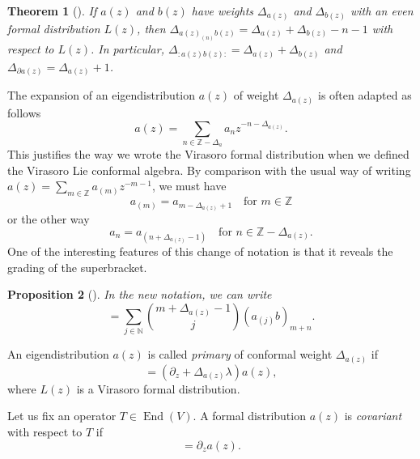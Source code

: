 \documentclass[a4paper, 12pt, reqno]{amsart}
\newtheorem{theorem}{Theorem}[section]
\newtheorem{proposition}[theorem]{Proposition}
\theoremstyle{remark}
\numberwithin{equation}{subsection}
\DeclareMathOperator{\End}{End}
\begin{document}
\begin{theorem}[{\cite[Proposition 3.7.4]{nozaradan_introduction_2008}}]
  \label{thr:13}
  If $a(z)$ and $b(z)$ have weights $\Delta_{a(z)}$ and $\Delta_{b(z)}$ with an even formal distribution $L(z)$, then $\Delta_{a(z)_{(n)}b(z)} = \Delta_{a(z)} + \Delta_{b(z)} - n - 1$ with respect to $L(z)$.
  In particular, $\Delta_{:a(z)b(z):} = \Delta_{a(z)} + \Delta_{b(z)}$ and $\Delta_{\partial a(z)} = \Delta_{a(z)} + 1$.
\end{theorem}

The expansion of an eigendistribution $a(z)$ of weight $\Delta_{a(z)}$ is often adapted as follows
\begin{equation*}
  a(z) = \sum_{n \in \mathbb{Z} - \Delta_a}a_nz^{-n - \Delta_{a(z)}}.
\end{equation*}
This justifies the way we wrote the Virasoro formal distribution when we defined the Virasoro Lie conformal algebra.
By comparison with the usual way of writing $a(z) = \sum_{m \in \mathbb{Z}}a_{(m)}z^{-m - 1}$, we must have
\begin{equation*}
  a_{(m)} = a_{m - \Delta_{a(z)} + 1} \quad \text{for }m \in \mathbb{Z}
\end{equation*}
or the other way
\begin{equation*}
  a_n = a_{(n + \Delta_{a(z)} - 1)} \quad \text{for }n \in \mathbb{Z} - \Delta_{a(z)}.
\end{equation*}
One of the interesting features of this change of notation is that it reveals the grading of the superbracket.

\begin{proposition}[{\cite[Proposition 3.7.6]{nozaradan_introduction_2008}}]
  \label{prp:8}
  In the new notation, we can write
  \begin{equation*}
    [a_m, b_n] = \sum_{j \in \mathbb{N}}\binom{m + \Delta_{a(z)} - 1}{j}(a_{(j)}b)_{m + n}.
  \end{equation*}
\end{proposition}

An eigendistribution $a(z)$ is called \emph{primary} of conformal weight $\Delta_{a(z)}$ if
\begin{equation*}
  [L(z)_{\lambda}a(z)] = (\partial_z + \Delta_{a(z)}\lambda)a(z),
\end{equation*}
where $L(z)$ is a Virasoro formal distribution.

Let us fix an operator $T \in \End(V)$.
A formal distribution $a(z)$ is \emph{covariant} with respect to $T$ if
\begin{equation*}
  [T, a(z)] = \partial_za(z).
\end{equation*}
\end{document}
